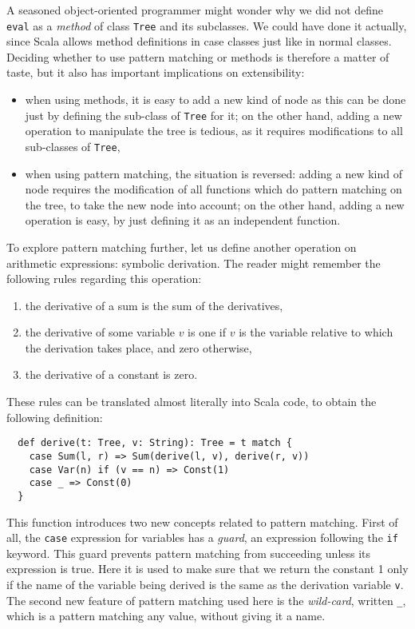 \documentclass[a4paper,11pt,twoside,titlepage]{article}
\begin{document}
A seasoned object-oriented programmer might wonder why we did not
define \lstinline?eval? as a \emph{method} of class \lstinline?Tree? and its
subclasses. We could have done it actually, since Scala allows method
definitions in case classes just like in normal classes. Deciding
whether to use pattern matching or methods is therefore a matter of
taste, but it also has important implications on extensibility:
\begin{itemize}
\item when using methods, it is easy to add a new kind of node as this
  can be done just by defining the sub-class of \lstinline?Tree? for it; on
  the other hand, adding a new operation to manipulate the tree is
  tedious, as it requires modifications to all sub-classes of
  \lstinline?Tree?,
\item when using pattern matching, the situation is reversed: adding a
  new kind of node requires the modification of all functions which do
  pattern matching on the tree, to take the new node into account; on
  the other hand, adding a new operation is easy, by just defining it
  as an independent function.
\end{itemize}

To explore pattern matching further, let us define another operation
on arithmetic expressions: symbolic derivation. The reader might
remember the following rules regarding this operation:
\begin{enumerate}
\item the derivative of a sum is the sum of the derivatives,
\item the derivative of some variable $v$ is one if $v$ is the
  variable relative to which the derivation takes place, and zero
  otherwise,
\item the derivative of a constant is zero.
\end{enumerate}
These rules can be translated almost literally into Scala code, to
obtain the following definition:
\begin{lstlisting}
  def derive(t: Tree, v: String): Tree = t match {
    case Sum(l, r) => Sum(derive(l, v), derive(r, v))
    case Var(n) if (v == n) => Const(1)
    case _ => Const(0)
  }
\end{lstlisting}%
This function introduces two new concepts related to pattern matching.
First of all, the \lstinline?case? expression for variables has a
\emph{guard}, an expression following the \lstinline?if? keyword. This
guard prevents pattern matching from succeeding unless its expression
is true. Here it is used to make sure that we return the constant 1
only if the name of the variable being derived is the same as the
derivation variable \lstinline?v?. The second new feature of pattern
matching used here is the \emph{wild-card}, written \lstinline?_?, which is
a pattern matching any value, without giving it a name.
\end{document}
